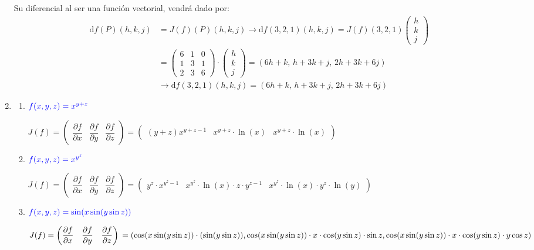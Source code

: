 \begin{enumerate}[label=\color{red}\textbf{\arabic*)}, leftmargin=*]
Su diferencial al ser una función vectorial, vendrá dado por:
\[ \begin{aligned}
\mathrm{d}f(P)(h,k,j)&=J(f)(P)(h,k,j)\longrightarrow\mathrm{d}f(3,2,1)(h,k,j)=J(f)(3,2,1)\begin{pmatrix}
h\\
k\\
j
\end{pmatrix}\\
&=\begin{pmatrix}
6 & 1 & 0 \\
1 & 3 & 1 \\
2 & 3 & 6
\end{pmatrix}\cdot\begin{pmatrix}
h\\
k\\
j
\end{pmatrix}=(6h+k,\, h+3k+j,\, 2h+3k+6j)\\
&\longrightarrow \mathrm{d}f(3,2,1)(h,k,j)=(6h+k,\, h+3k+j,\, 2h+3k+6j)
\end{aligned} \]

\item {}
\begin{enumerate}[label=\color{red}\textbf{\alph*)}]
	\item $\textcolor{blue}{f(x,y,z)=x^{y+z}}$
	
	$J(f)=\begin{pmatrix}
	\dfrac{\partial f}{\partial x} & \dfrac{\partial f}{\partial y} & \dfrac{\partial f}{\partial z}
	\end{pmatrix}=\begin{pmatrix}
	(y+z)x^{y+z-1} & x^{y+z}\cdot\ln(x) & x^{y+z}\cdot\ln(x)
	\end{pmatrix}$
	
	\item $\textcolor{blue}{f(x,y,z)=x^{y^{z}}}$
	
	$J(f)=\begin{pmatrix}
		\dfrac{\partial f}{\partial x} & \dfrac{\partial f}{\partial y} & \dfrac{\partial f}{\partial z}
		\end{pmatrix}=\begin{pmatrix}
		y^{z}\cdot x^{y^{z}-1} & x^{y^{z}}\cdot\ln(x)\cdot z\cdot y^{z-1} & x^{y^{z}}\cdot\ln(x)\cdot y^{z}\cdot\ln(y)
		\end{pmatrix}$
		
	\item $\textcolor{blue}{f(x,y,z)=\sin(x\sin(y\sin z))}$
	
	$J(f)=\begin{pmatrix}
			\dfrac{\partial f}{\partial x} & \dfrac{\partial f}{\partial y} & \dfrac{\partial f}{\partial z}
			\end{pmatrix}\\=
			\left(\cos(x\sin(y\sin z))\cdot(\sin(y\sin z)), \cos(x\sin(y\sin z))\cdot x\cdot\cos(y\sin z)\cdot\sin z , \cos(x\sin(y\sin z))\cdot x\cdot \cos(y\sin z)\cdot y\cos z\right)$
			

\end{enumerate}
\end{enumerate}
